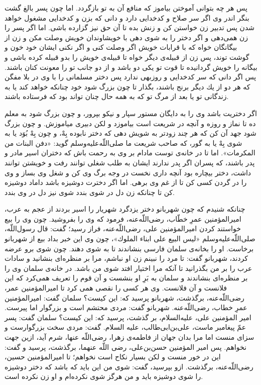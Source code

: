 پس هر چه بتوانى آموختن بياموز كه منافع آن به تو بازگردد. اما چون پسر بالغ گشت بنگر اندر وى اگر سر صلاح و كدخدايى دارد و دانى كه بزن و كدخدايى مشغول خواهد شدن پس تدبير زن خواستن كن و زنش بده تا آن حق نيز گزارده باشى. اما اگر پسر را زن همى‌دهى و اگر دختر را به شوى دهى با خويشاوندان خويش وصلت مكن و زن از بيگانگان خواه كه با قرابات خويش اگر وصلت كنى و اگر نكنى ايشان خود خون و گوشت توند، پس زن از قبيله‌ی ديگر خواه تا قبيله‌ی خويش را بدو قبيله كرده باشى و بيگانه را خويش گردانيده تا قوت تو يكى دو باشد و از دو جانب تو را معونت كنان باشند. پس اگر دانى كه سر كدخدايى و روزبهى ندارد پس دختر مسلمانى را با وى در بلا مفگن كه هر دو از يك ديگر برنج باشند، بگذار تا چون بزرگ شود خود چنانكه خواهد كند يا به زندگانى تو يا بعد از مرگ تو كه به همه حال چنان تواند بود كه فرستاده باشند. 

اگر دختريت باشد وى را به دايگان مستور سپار و نيكو بپرور، و چون بزرگ شود به معلم ده تا نماز و روزه و آنچه در شريعت است بياموزد و لكن دبيرى مياموزش. و چون بزرگ شود جهد آن كن كه هر چند زودتر به شويش دهى كه دختر نابوده بِهْ، و چون بِهْ بُوَد يا به شوى بِهْ يا به گور، كه صاحب شريعت ما صلى‌اللّه‌عليه‌و‌سلم گويد: «دفن البنات من المكرمات». اما تا در خانه‌ی توست مادام بر وى به رحمت باش كه دختران اسير مادر و پدر باشند، كه پسران اگر پدر ندارند ايشان به طلب شغلى توانند‌ رفت و خويشتن توانند داشت، دختر بيچاره بود آنچه دارى نخست در وجه برگ وى كن و شغل وى بساز و وى را در گردن كسى كن تا از غم وى برهى. اما اگر دخترت دوشيزه باشد داماد دوشيزه كن تا چنانكه زن دل در شوى بندد شوى نيز دل در وى بندد.

چنانكه شنيدم كه چون شهربانو دختر يزدگرد شهريار را اسير بردند از عجم به عرب، امير‌المؤمنين عمر‌ِ خطّاب، رضى‌اللّه‌عنه، فرمود كه وى را بفروشيد. چون وى را بيع خواستند كردن امير‌المؤمنين على، رضى‌اللّه‌عنه، فراز رسيد؛ گفت: قال رسول‌اللّه، صلى‌اللّه‌عليه‌و‌سلم «ليس البيع على ابناء الملوك»، چون وى اين خبر بداد بيع از شهربانو برخاست. او را بخانه‌ی سلمان فارسى بنشاندند تا به شوى دهند. چون شوى برو عرضه كردند، شهربانو گفت: تا مرد را نبينم زن او نباشم، مرا بر منظره‌اى بنشانيد و سادات عرب را بر من بگذرانيد تا آنكه مرا اختيار افتد شوى من باشد. در خانه‌ی سلمان وى را بر منظره‌اى بنشاندند و سلمان به بَرِ او بنشست و آن قوم را تعريف همى‌كرد كه اين فلانست و آن فلانست. وى هر كسى را نقصى همى كرد تا امير‌المؤمنين عمر، رضى‌اللّه‌عنه، برگذشت، شهربانو پرسيد كه: اين كيست‌؟ سلمان گفت: امير‌المؤمنين عمرِ خطاب، رضى‌اللّه‌عنه. شهربانو گفت: مردى محتشم است و بزرگوار اما پيرست. امير المؤمنين على، عليه‌السلام، بر گذشت، پرسيد كه: اين كيست‌؟ سلمان گفت: پسر عمّ پيغامبر ماست، على‌بن‌‌ابى‌طالب، عليه السلام. گفت: مردى سخت بزرگوارست و سزاى منست اما مرا بدان جهان از فاطمه‌ی زهرا، رضى‌اللّه عنها، شرم آيد، ازين جهت نخواهم. پس امير المؤمنين حسن‌بن‌على، رضى اللّه عنهما، برگذشت، پرسيد و گفت: اين در خور منست و لكن بسيار نكاح است نخواهم؛ تا امير‌المؤمنين حسين، رضى‌اللّه‌عنه، برگذشت. ازو بپرسيد، گفت: شوى من اين بايد كه باشد كه دختر دوشيزه را شوى دوشيزه بايد و من هرگز شوى نكرده‌ام و او زن نكرده است.

